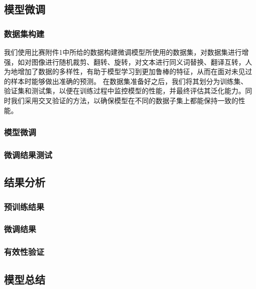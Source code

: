 \documentclass[a4paper]{zreport}
\begin{document}
\subsection{模型微调}

\subsubsection{数据集构建}
我们使用比赛附件1中所给的数据构建微调模型所使用的数据集，对数据集进行增强，如对图像进行随机裁剪、翻转、旋转，对文本进行同义词替换、翻译互转，人为地增加了数据的多样性，有助于模型学习到更加鲁棒的特征，从而在面对未见过的样本时能够做出准确的预测。
在数据集准备好之后，我们将其划分为训练集、验证集和测试集，以便在训练过程中监控模型的性能，并最终评估其泛化能力。同时我们采用交叉验证的方法，以确保模型在不同的数据子集上都能保持一致的性能。
\subsubsection{模型微调}

\subsubsection{微调结果测试}




\subsection{结果分析}

\subsubsection{预训练结果}

\subsubsection{微调结果}

\subsubsection{有效性验证}

\subsection{模型总结}


\cite{*}

\newpage




\end{document}
